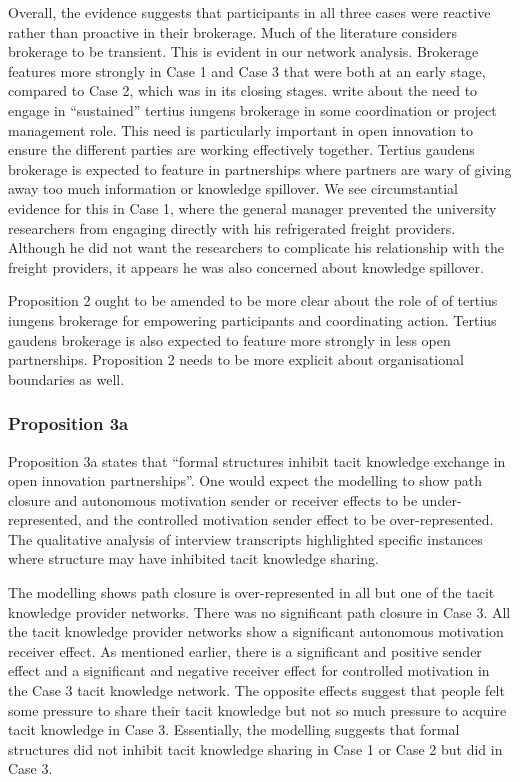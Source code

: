 Overall, the evidence suggests that participants in all three cases were reactive rather than proactive in their brokerage. Much of the literature considers brokerage to be transient. This is evident in our network analysis. Brokerage features more strongly in Case 1 and Case 3 that were both at an early stage, compared to Case 2, which was in its closing stages. \citet{grosser2019measuring} write about the need to engage in \enquote{sustained} tertius iungens brokerage in some coordination or project management role. This need is particularly important in open innovation to ensure the different parties are working effectively together. Tertius gaudens brokerage is expected to feature in partnerships where partners are wary of giving away too much information or knowledge spillover. We see circumstantial evidence for this in Case 1, where the general manager prevented the university researchers from engaging directly with his refrigerated freight providers. Although he did not want the researchers to complicate his relationship with the freight providers, it appears he was also concerned about knowledge spillover. \medskip

Proposition 2 ought to be amended to be more clear about the role of of tertius iungens brokerage for empowering participants and coordinating action. Tertius gaudens brokerage is also expected to feature more strongly in less open partnerships. Proposition 2 needs to be more explicit about organisational boundaries as well. 

\subsubsection{Proposition 3a}

Proposition 3a states that \enquote{formal structures inhibit tacit knowledge exchange in open innovation partnerships}. One would expect the modelling to show path closure and autonomous motivation sender or receiver effects to be under-represented, and the controlled motivation sender effect to be over-represented. The qualitative analysis of interview transcripts highlighted specific instances where structure may have inhibited tacit knowledge sharing. \medskip

The modelling shows path closure is over-represented in all but one of the tacit knowledge provider networks. There was no significant path closure in Case 3. All the tacit knowledge provider networks show a significant autonomous motivation receiver effect. As mentioned earlier, there is a significant and positive sender effect and a significant and negative receiver effect for controlled motivation in the Case 3 tacit knowledge network. The opposite effects suggest that people felt some pressure to share their tacit knowledge but not so much pressure to acquire tacit knowledge in Case 3. Essentially, the modelling suggests that formal structures did not inhibit tacit knowledge sharing in Case 1 or Case 2 but did in Case 3. \medskip

